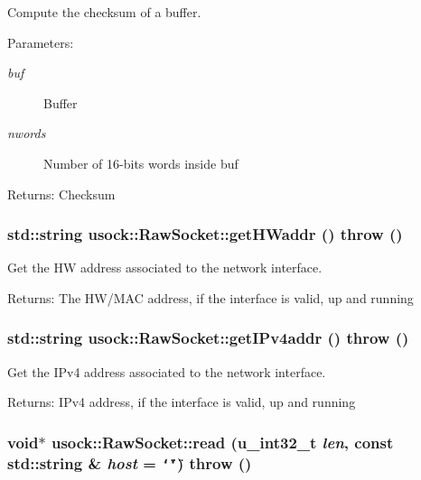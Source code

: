 Compute the checksum of a buffer. 

\begin{Desc}
\item[Parameters:]
\begin{description}
\item[{\em buf}]Buffer \item[{\em nwords}]Number of 16-bits words inside buf \end{description}
\end{Desc}
\begin{Desc}
\item[Returns:]Checksum \end{Desc}
\hypertarget{classusock_1_1RawSocket_1276f5fcc7bc3b41d9d11055887ab7a9}{
\subsubsection[{getHWaddr}]{\setlength{\rightskip}{0pt plus 5cm}std::string usock::RawSocket::getHWaddr ()  throw ()}}
\label{classusock_1_1RawSocket_1276f5fcc7bc3b41d9d11055887ab7a9}


Get the HW address associated to the network interface. 

\begin{Desc}
\item[Returns:]The HW/MAC address, if the interface is valid, up and running \end{Desc}
\hypertarget{classusock_1_1RawSocket_3b0c8f2f539982c8f37a66ebc29746a0}{
\subsubsection[{getIPv4addr}]{\setlength{\rightskip}{0pt plus 5cm}std::string usock::RawSocket::getIPv4addr ()  throw ()}}
\label{classusock_1_1RawSocket_3b0c8f2f539982c8f37a66ebc29746a0}


Get the IPv4 address associated to the network interface. 

\begin{Desc}
\item[Returns:]IPv4 address, if the interface is valid, up and running \end{Desc}
\hypertarget{classusock_1_1RawSocket_bc4cd4449b47d28397fc270447405609}{
\subsubsection[{read}]{\setlength{\rightskip}{0pt plus 5cm}void$\ast$ usock::RawSocket::read (u\_\-int32\_\-t {\em len}, \/  const std::string \& {\em host} = {\tt \char`\"{}\char`\"{}})  throw ()}}
\label{classusock_1_1RawSocket_bc4cd4449b47d28397fc270447405609}


